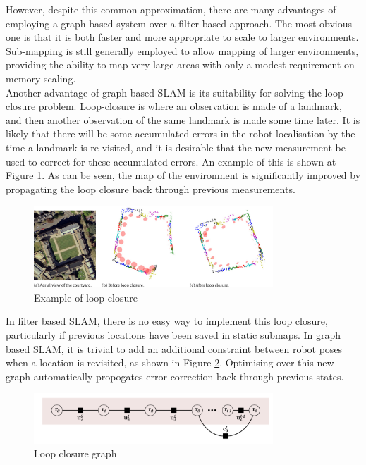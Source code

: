 \documentclass[capstone_report.tex]{subfiles}
\begin{document}
However, despite this common approximation, there are many advantages of employing a graph-based system over a filter based approach. The most obvious one is that it is both faster and more appropriate to scale to larger environments. Sub-mapping is still generally employed to allow mapping of larger environments, providing the ability to map very large areas with only a modest requirement on memory scaling. \\

Another advantage of graph based SLAM is its suitability for solving the loop-closure problem. Loop-closure is where an observation is made of a landmark, and then another observation of the same landmark is made some time later. It is likely that there will be some accumulated errors in the robot localisation by the time a landmark is re-visited, and it is desirable that the new measurement be used to correct for these accumulated errors. An example of this is shown at Figure \ref{fig:loopClose}. As can be seen, the map of the environment is significantly improved by propagating the loop closure back through previous measurements.

\begin{figure}[H]
   \centering
   \includegraphics[width=0.8\textwidth]{imgs/loopClosure.png}
   \caption{Example of loop closure\label{fig:loopClose}}
\end{figure} 

In filter based SLAM, there is no easy way to implement this loop closure, particularly if previous locations have been saved in static submaps. In graph based SLAM, it is trivial to add an additional constraint between robot poses when a location is revisited, as shown in Figure \ref{fig:loopClose2}. Optimising over this new graph automatically propogates error correction back through previous states.

\begin{figure}[H]
  \centering
  \includegraphics[width=0.8\textwidth]{imgs/loopClosureGraph.png}
  \caption{Loop closure graph\label{fig:loopClose2}}
\end{figure}
\end{document}
